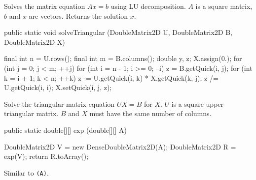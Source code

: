 \begin{tabb} Solves the matrix equation $Ax = b$ using LU decomposition.
$A$ is a square matrix, $b$ and $x$ are vectors. Returns the solution $x$.
\end{tabb}
\begin{htmlonly}
\end{htmlonly}
\begin{code}

   public static void solveTriangular (DoubleMatrix2D U, DoubleMatrix2D B,
                                       DoubleMatrix2D X) \begin{hide} {
      final int n = U.rows();
      final int m = B.columns();
      double y, z;
      X.assign(0.);
      for (int j = 0; j < m; ++j) {
         for (int i = n - 1; i >= 0; --i) {
            z = B.getQuick(i, j);
            for (int k = i + 1; k < n; ++k)
               z -= U.getQuick(i, k) * X.getQuick(k, j);
            z /= U.getQuick(i, i);
            X.setQuick(i, j, z);
         }
      }
   } \end{hide}
\end{code}
\begin{tabb} Solve the triangular matrix equation $UX = B$ for $X$.
 $U$ is a square upper triangular matrix. $B$ and $X$ must have the same
number of columns.
\end{tabb}
\begin{htmlonly}
\end{htmlonly}
\begin{code}

   public static double[][] exp (double[][] A) \begin{hide} {
      DoubleMatrix2D V = new DenseDoubleMatrix2D(A);
      DoubleMatrix2D R = exp(V);
      return R.toArray();
   } \end{hide}
\end{code}
\begin{tabb} Similar to \texttt{(A)}.
\end{tabb}
\begin{htmlonly}
\end{htmlonly}
